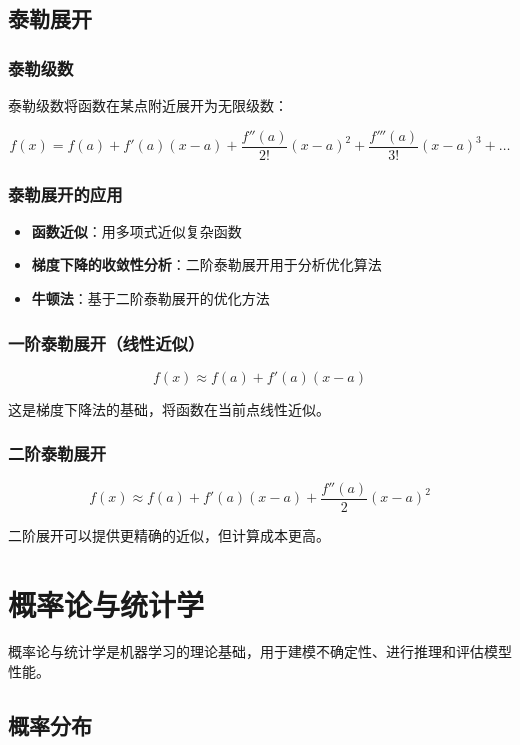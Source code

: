\documentclass[12pt,UTF8]{ctexbook}
\begin{document}
\subsection{泰勒展开}

\subsubsection{泰勒级数}

泰勒级数将函数在某点附近展开为无限级数：

$$f(x) = f(a) + f'(a)(x-a) + \frac{f''(a)}{2!}(x-a)^2 + \frac{f'''(a)}{3!}(x-a)^3 + \dots$$

\subsubsection{泰勒展开的应用}

\begin{itemize}[leftmargin=2cm]
    \item \textbf{函数近似}：用多项式近似复杂函数
    \item \textbf{梯度下降的收敛性分析}：二阶泰勒展开用于分析优化算法
    \item \textbf{牛顿法}：基于二阶泰勒展开的优化方法
\end{itemize}

\subsubsection{一阶泰勒展开（线性近似）}

$$f(x) \approx f(a) + f'(a)(x-a)$$

这是梯度下降法的基础，将函数在当前点线性近似。

\subsubsection{二阶泰勒展开}

$$f(x) \approx f(a) + f'(a)(x-a) + \frac{f''(a)}{2}(x-a)^2$$

二阶展开可以提供更精确的近似，但计算成本更高。

\section{概率论与统计学}
\label{sec:probability}

概率论与统计学是机器学习的理论基础，用于建模不确定性、进行推理和评估模型性能。

\subsection{概率分布}
\end{document}
